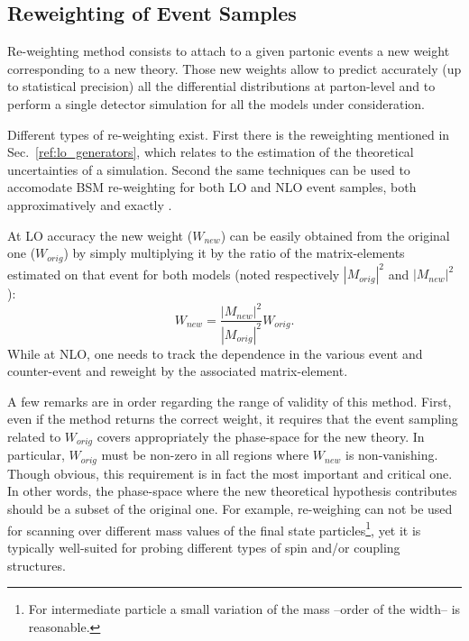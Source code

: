 \documentclass{article}
\begin{document}


\subsection{Reweighting of Event Samples}

Re-weighting method consists to attach to a given partonic events a new weight corresponding to a new theory. Those new weights allow to predict accurately (up to statistical precision) all the differential distributions at parton-level and to perform a single detector simulation for all the models under consideration.

Different types of re-weighting exist. First there is the reweighting mentioned in Sec.~\ref{ref:lo_generators}, which relates to the estimation of the theoretical uncertainties of a simulation. 
Second the same techniques can be used to accomodate BSM re-weighting for both LO \cite{Gainer:2014bta,Baglio:2014uba,Kalinowski:2016qcd,Mattelaer:2016gcx} and  NLO event samples, both approximatively \cite{Alioli:2010xd,REPOLO} and exactly \cite{Mattelaer:2016gcx}.

At LO accuracy the new weight ($W_{new}$) can be easily obtained from the original one ($W_{orig}$) by simply multiplying it by the ratio of the matrix-elements estimated on that event for both models (noted respectively $|M_{orig}|^2$ and $|M_{new}|^2$):
\begin{equation}\label{me_re-weighting}
W_{new} = \frac{|M_{new}|^2}{|M_{orig}|^2}W_{orig}.
\end{equation}
While at NLO, one needs to track the dependence in the various event and counter-event and reweight by the associated matrix-element.

A few remarks are in order regarding the range of validity of this method. First, even if the method returns the correct weight, it requires that the event sampling related to $W_{orig}$ covers appropriately the phase-space for the new theory. In particular, $W_{orig}$ must be non-zero in all regions where $W_{new}$ is non-vanishing. Though obvious, this requirement is in fact the most important and critical one. 
In other words, the phase-space where the new theoretical hypothesis contributes should be a subset of the original one. For example, re-weighing can not be used for scanning over different mass values of the final state particles\footnote{For intermediate particle a small variation of the mass --order of the width-- is reasonable.}, yet it is typically well-suited for probing different types of spin and/or coupling structures.
\end{document}
